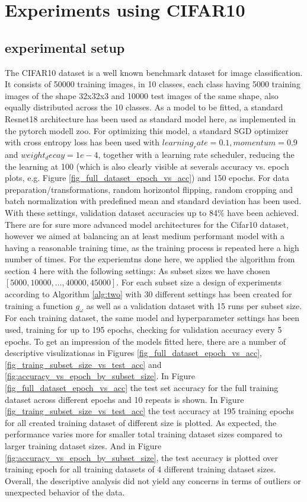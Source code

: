 \documentclass{article} %
\begin{document}
\section{Experiments using CIFAR10}

\subsection{experimental setup}
    The CIFAR10 dataset \cite{Cifar10} is a well known benchmark dataset for image classification.
    It consists of 50000 training images, in 10 classes, each class having 5000 training images of the shape 32x32x3 and 10000 test images of the same shape, also equally distributed across the 10 classes.
     As a model to be fitted, a standard Resnet18 architecture \cite{he2015resnet} has been used as standard model here, as implemented in the pytorch \cite{pytorch} modell zoo. 
     For optimizing this model, a standard SGD optimizer with cross entropy loss has been used with $learning_rate = 0.1, momentum=0.9$ and $weight_decay=1e-4$, together with a learning rate scheduler, reducing the the learning at 100 (which is also clearly visible at severals accuracy vs. epoch plots, e.g. Figure \ref{fig_full_dataset_epoch_vs_acc}) and 150 epochs.
     For data preparation/transformations, random horizontol flipping, random cropping and batch normalization with predefined mean and standard deviation  has been used. 
     With these settings, validation dataset accuracies up to 84\% have been achieved.
     There are for sure more advanced model architectures for the Cifar10 dataset, however we aimed at balancing an at least medium performant model with a having a reasonable training time, as the training process is repeated here a high number of times.
     For the experiemtns done here, we applied the algorithm from section 4 here with the following settings:
     As subset sizes we have chosen $[5000, 10000, \dots, 40000, 45000]$. For each subset size a design of experiments according to Algorithm \ref{alg:two} with 30 different settings has been created for training a function $g_{\omega}$ as well as a validation dataset with 15 runs per subset size.
     For each training dataset, the same model and hyperparameter settings has been used, training for up to 195 epochs, checking for validation accuracy every 5 epochs.
     To get an impression of the models fitted here, there are a number of descriptive visulizationas in Figures \ref{fig_full_dataset_epoch_vs_acc}, \ref{fig_traing_subset_size_vs_test_acc} and \ref{fig:accuracy_vs_epoch_by_subset_size}. In Figure \ref{fig_full_dataset_epoch_vs_acc} the test set accuracy for the full training dataset across different epochs and 10 repeats is shown. 
     In Figure \ref{fig_traing_subset_size_vs_test_acc} the test accuracy at 195 training epochs for all created training dataset of different size is plotted. As expected, the performance varies more for smaller total training dataset sizes compared to larger training dataset sizes.  
     And in Figure \ref{fig:accuracy_vs_epoch_by_subset_size}, the test accuracy is plotted over training epoch for all training datasets of 4 different training dataset sizes.
     Overall, the descriptive analysis did not yield any concerns in terms of outliers or unexpected behavior of the data.
\end{document}
